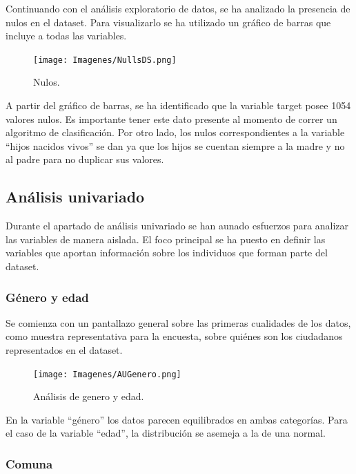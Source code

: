 \documentclass[a4paper]{article}
\begin{document}
    \newpage

    Continuando con el análisis exploratorio de datos, se ha analizado la presencia de nulos en el dataset. Para visualizarlo se ha utilizado un gráfico de barras que incluye a todas las variables. 
   
    \begin{figure}[H]
        \centering
        \texttt{[image: Imagenes/NullsDS.png]}
        \caption{Nulos.}
        \label{nulls}
    \end{figure}
 
    A partir del gráfico de barras, se ha identificado que la variable target posee 1054 valores nulos. Es importante tener este dato presente al momento de correr un algoritmo de clasificación. Por otro lado, los nulos correspondientes a la variable ``hijos nacidos vivos'' se dan ya que los hijos se cuentan siempre a la madre y no al padre para no duplicar sus valores.

    \subsection{Análisis univariado}

    Durante el apartado de análisis univariado se han aunado esfuerzos para analizar las variables de manera aislada. El foco principal se ha puesto en definir las variables que aportan información sobre los individuos que forman parte del dataset.
        \subsubsection{Género y edad}
           
            Se comienza con un pantallazo general sobre las primeras cualidades de los datos, como muestra representativa para la encuesta, sobre quiénes son los ciudadanos representados en el dataset.
           
            \begin{figure}[H]
                \centering
                \texttt{[image: Imagenes/AUGenero.png]}
                \caption{Análisis de genero y edad.}
                \label{AU genre and age}
            \end{figure}
            
            En la variable ``género'' los datos parecen equilibrados en ambas categorías. Para el caso de la variable ``edad'', la distribución se asemeja a la de una normal.
           
            \subsubsection{Comuna}
           
\end{document}
